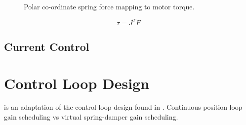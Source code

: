 \begin{figure}
\centering
{}

\caption{Polar co-ordinate spring force mapping to motor torque.}
\label{fig:Polar co-ordinate spring force mapping to motor torque}
\end{figure}

\begin{equation}
\tau = J^TF
\end{equation}

\subsection{Current Control}


\section{Control Loop Design}
 is an adaptation of the control loop design found in \cite{Kalouche2016}. Continuous position loop gain scheduling vs virtual spring-damper gain scheduling.

